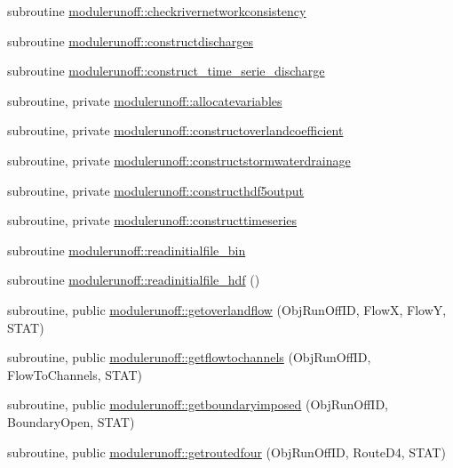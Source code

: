 \begin{DoxyCompactItemize}
\item 
subroutine \mbox{\hyperlink{namespacemodulerunoff_aea1e4fa9f8992257e2f3d4f38cd3953d}{modulerunoff\+::checkrivernetworkconsistency}}
\item 
subroutine \mbox{\hyperlink{namespacemodulerunoff_aaa760a0a33dfff4681a831fe25d1b075}{modulerunoff\+::constructdischarges}}
\item 
subroutine \mbox{\hyperlink{namespacemodulerunoff_a7d3fe3f8c8fecb1a73f35d1963f7b2b5}{modulerunoff\+::construct\+\_\+time\+\_\+serie\+\_\+discharge}}
\item 
subroutine, private \mbox{\hyperlink{namespacemodulerunoff_a3a007b7a4dcf19d2d269172e36d996de}{modulerunoff\+::allocatevariables}}
\item 
subroutine, private \mbox{\hyperlink{namespacemodulerunoff_a9750562ffa96a2b097ee6cfb440440ec}{modulerunoff\+::constructoverlandcoefficient}}
\item 
subroutine, private \mbox{\hyperlink{namespacemodulerunoff_a03335615cccffdf4fcbc7979c2e2b299}{modulerunoff\+::constructstormwaterdrainage}}
\item 
subroutine, private \mbox{\hyperlink{namespacemodulerunoff_a2cafb8c9efc342200a6ec558a7eeb90d}{modulerunoff\+::constructhdf5output}}
\item 
subroutine, private \mbox{\hyperlink{namespacemodulerunoff_a38585735a1deed54aec387488350fd0d}{modulerunoff\+::constructtimeseries}}
\item 
subroutine \mbox{\hyperlink{namespacemodulerunoff_abc7533c7bdb5fde4b69ad3d1db1b0b1a}{modulerunoff\+::readinitialfile\+\_\+bin}}
\item 
subroutine \mbox{\hyperlink{namespacemodulerunoff_a0076542117101ad74013563790aca394}{modulerunoff\+::readinitialfile\+\_\+hdf}} ()
\item 
subroutine, public \mbox{\hyperlink{namespacemodulerunoff_a4d5da3ce5f5efddf1d2957ea8e1e1791}{modulerunoff\+::getoverlandflow}} (Obj\+Run\+Off\+ID, FlowX, FlowY, S\+T\+AT)
\item 
subroutine, public \mbox{\hyperlink{namespacemodulerunoff_af164eb766650a303ad4fbe9de7bcb541}{modulerunoff\+::getflowtochannels}} (Obj\+Run\+Off\+ID, Flow\+To\+Channels, S\+T\+AT)
\item 
subroutine, public \mbox{\hyperlink{namespacemodulerunoff_a721381be9f2b0f07b9349c1a1df63001}{modulerunoff\+::getboundaryimposed}} (Obj\+Run\+Off\+ID, Boundary\+Open, S\+T\+AT)
\item 
subroutine, public \mbox{\hyperlink{namespacemodulerunoff_a092094d64e7a0ff361f536ab75f67317}{modulerunoff\+::getroutedfour}} (Obj\+Run\+Off\+ID, Route\+D4, S\+T\+AT)

\end{DoxyCompactItemize}
